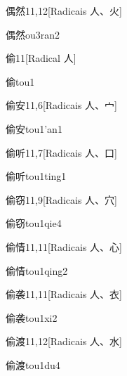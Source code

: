 \begin{entry}{偶然}{11,12}[Radicais ⼈、⽕]
  \begin{phonetics}{偶然}{ou3ran2}
  \end{phonetics}
\end{entry}

\begin{entry}{偷}{11}[Radical ⼈]
  \begin{phonetics}{偷}{tou1}
  \end{phonetics}
\end{entry}

\begin{entry}{偷安}{11,6}[Radicais ⼈、⼧]
  \begin{phonetics}{偷安}{tou1'an1}
  \end{phonetics}
\end{entry}

\begin{entry}{偷听}{11,7}[Radicais ⼈、⼝]
  \begin{phonetics}{偷听}{tou1ting1}
  \end{phonetics}
\end{entry}

\begin{entry}{偷窃}{11,9}[Radicais ⼈、⽳]
  \begin{phonetics}{偷窃}{tou1qie4}
  \end{phonetics}
\end{entry}

\begin{entry}{偷情}{11,11}[Radicais ⼈、⼼]
  \begin{phonetics}{偷情}{tou1qing2}
  \end{phonetics}
\end{entry}

\begin{entry}{偷袭}{11,11}[Radicais ⼈、⾐]
  \begin{phonetics}{偷袭}{tou1xi2}
  \end{phonetics}
\end{entry}

\begin{entry}{偷渡}{11,12}[Radicais ⼈、⽔]
  \begin{phonetics}{偷渡}{tou1du4}
  \end{phonetics}
\end{entry}

